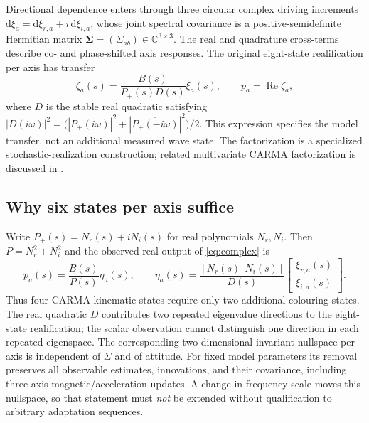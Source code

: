 \documentclass[conference]{IEEEtran}
\newcommand{\mat}[1]{\bm{#1}}
\newcommand{\Rea}{\operatorname{Re}}
\begin{document}
Directional dependence enters through three circular complex driving
increments $\mathrm d\xi_a=\mathrm d\xi_{r,a}+i\,\mathrm d\xi_{i,a}$,
whose joint spectral covariance is a positive-semidefinite Hermitian
matrix $\mat\Sigma=(\Sigma_{ab})\in\mathbb C^{3\times3}$. The real and
quadrature cross-terms describe co- and phase-shifted axis responses.
The original eight-state realification per axis has transfer
\begin{equation}
 \zeta_a(s)=\frac{B(s)}{P_+(s)D(s)}\xi_a(s),\qquad
 p_a=\Rea\zeta_a,
 \label{eq:complex}
\end{equation}
where $D$ is the stable real quadratic satisfying
$|D(i\omega)|^2=\bigl(|P_+(i\omega)|^2+
|\overline{P_+(-i\omega)}|^2\bigr)/2$.
This expression specifies the model transfer, not an additional measured
wave state. The factorization is a specialized stochastic-realization
construction; related multivariate CARMA factorization is discussed in
\cite{fasen21}.

\subsection{Why six states per axis suffice}
Write $P_+(s)=N_r(s)+iN_i(s)$ for real polynomials $N_r,N_i$. Then
$P=N_r^2+N_i^2$ and the observed real output of \eqref{eq:complex} is
\begin{equation}
 p_a(s)=\frac{B(s)}{P(s)}\eta_a(s),\qquad
 \eta_a(s)=\frac{[N_r(s)\ \ N_i(s)]}{D(s)}
 \begin{bmatrix}\xi_{r,a}(s)\\\xi_{i,a}(s)\end{bmatrix}.
 \label{eq:factor}
\end{equation}
Thus four CARMA kinematic states require only two additional colouring
states. The real quadratic $D$ contributes two repeated eigenvalue
directions to the eight-state realification; the scalar observation cannot
distinguish one direction in each repeated eigenspace. The corresponding
two-dimensional invariant nullspace per axis is independent of $\Sigma$
and of attitude. For fixed model parameters its removal preserves all
observable estimates, innovations, and their covariance, including
three-axis magnetic/acceleration updates. A change in frequency scale
moves this nullspace, so that statement must \emph{not} be extended without
qualification to arbitrary adaptation sequences.
\end{document}
